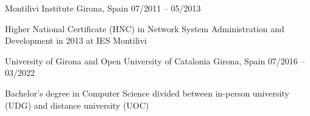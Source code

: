 \documentclass[]{awesome-cv}
\begin{document}
\vspace{8mm}
\begin{cventries}
	\vspace{2mm}
	\cventry
	{}
	{Montilivi Institute \vspace{-5mm}}
	{Girona, Spain \vspace{-5mm}}
	{07/2011 – 05/2013 \vspace{-5mm}}
	{\begin{cvsectionnormaltext} 
		\item{Higher National Certificate (HNC) in Network System Administration and Development in 2013 at IES Montilivi}
	\end{cvsectionnormaltext}}

 \cventry
	{}
	{University of Girona and Open University of Catalonia \vspace{-5mm}}
	{Girona, Spain \vspace{-5mm}}
	{07/2016 – 03/2022 \vspace{-5mm}}
	{\begin{cvsectionnormaltext} 
		\item{Bachelor's degree in Computer Science divided between in-person university (UDG) and distance university (UOC)}
	\end{cvsectionnormaltext}}
\end{cventries}
\end{document}
